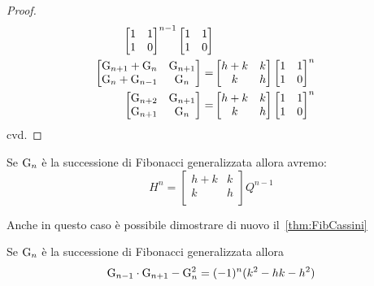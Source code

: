 \begin{proof}
\begin{align*}
\begin{bmatrix}
	1&1\\ 1&0\\
\end{bmatrix}^{n-1}\begin{bmatrix}
1&1\\ 1&0\\
\end{bmatrix}\\
\begin{bmatrix}
	\mathrm{G}_{n+1}+\mathrm{G}_{n}&\mathrm{G}_{n+1}\\\mathrm{G}_{n}+\mathrm{G}_{n-1}&\mathrm{G}_{n}
\end{bmatrix}=&\begin{bmatrix}
	h+k&k\\k&h\\
\end{bmatrix}\begin{bmatrix}
	1&1\\ 1&0\\
\end{bmatrix}^{n}\\
\begin{bmatrix}
	\mathrm{G}_{n+2}&\mathrm{G}_{n+1}\\\mathrm{G}_{n+1}&\mathrm{G}_{n}
\end{bmatrix}=&\begin{bmatrix}
	h+k&k\\k&h\\
\end{bmatrix}\begin{bmatrix}
	1&1\\ 1&0\\
\end{bmatrix}^{n}\\
\end{align*}
cvd.
\end{proof}
\begin{cor}[Derivazione]
	Se $\mathrm{G}_{n}$ è la successione di Fibonacci generalizzata allora avremo:
\begin{equation}
	H^n=\begin{bmatrix}
		h+k&k\\k&h\\
	\end{bmatrix}Q^{n-1}
\end{equation}
\end{cor}
Anche in questo caso è possibile dimostrare di nuovo 
il~\vref{thm:FibCassini} 
\begin{thm}\label{thm:identitàCassinigeneralizzatamatrici}
	Se $\mathrm{G}_{n}$ è la successione di Fibonacci generalizzata allora 
	\begin{equation}
		\mathrm{G}_{n-1}\cdot\mathrm{G}_{n+1}-\mathrm{G}_{n}^2=(-1)^n(k^2-hk-h^2)
	\end{equation}
\end{thm}
